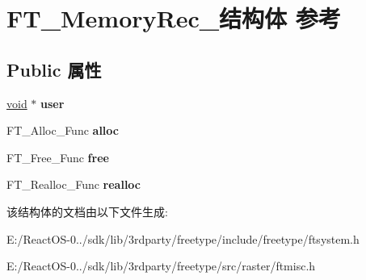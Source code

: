 \hypertarget{struct_f_t___memory_rec__}{}\section{F\+T\+\_\+\+Memory\+Rec\+\_\+结构体 参考}
\label{struct_f_t___memory_rec__}
\subsection*{Public 属性}
\begin{DoxyCompactItemize}
\item 
\mbox{\label{struct_f_t___memory_rec___a8fec81d80999f64392ca0b8d0b5bffbf}} 
\hyperlink{interfacevoid}{void} $\ast$ {\bfseries user}
\item 
\mbox{\label{struct_f_t___memory_rec___a2269eada6afbb008fe5c73707145410c}} 
F\+T\+\_\+\+Alloc\+\_\+\+Func {\bfseries alloc}
\item 
\mbox{\label{struct_f_t___memory_rec___a83ab2422bd9265d8731b9e5e368ba240}} 
F\+T\+\_\+\+Free\+\_\+\+Func {\bfseries free}
\item 
\mbox{\label{struct_f_t___memory_rec___a5ce3424cc72e898fe973ffeabe44a95c}} 
F\+T\+\_\+\+Realloc\+\_\+\+Func {\bfseries realloc}
\end{DoxyCompactItemize}


该结构体的文档由以下文件生成\+:\begin{DoxyCompactItemize}
\item 
E\+:/\+React\+O\+S-\/0../sdk/lib/3rdparty/freetype/include/freetype/ftsystem.\+h\item 
E\+:/\+React\+O\+S-\/0../sdk/lib/3rdparty/freetype/src/raster/ftmisc.\+h\end{DoxyCompactItemize}
